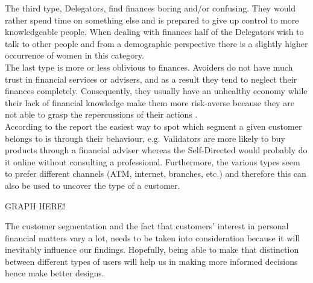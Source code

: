 The third type, Delegators, find finances boring and/or confusing. They would rather spend time on something else and is prepared to give up control to more knowledgeable people. When dealing with finances half of the Delegators wish to talk to other people and from a demographic perspective there is a slightly higher occurrence of women in this category.\\
The last type is more or less oblivious to finances. Avoiders do not have much trust in financial services or advisers, and as a result they tend to neglect their finances completely. Consequently, they usually have an unhealthy economy while their lack of financial knowledge make them more risk-averse because they are not able to grasp the repercussions of their actions \cite[p.~10-11]{ensor2006segmenting}.\\
According to the report the easiest way to spot which segment a given customer belongs to is through their behaviour, e.g. Validators are more likely to buy products through a financial adviser whereas the Self-Directed would probably do it online without consulting a professional. Furthermore, the various types seem to prefer different channels (ATM, internet, branches, etc.) and therefore this can also be used to uncover the type of a customer.

GRAPH HERE!

The customer segmentation and the fact that customers’ interest in personal financial matters vary a lot, needs to be taken into consideration because it will inevitably influence our findings. Hopefully, being able to make that distinction between different types of users will help us in making more informed decisions hence make better designs.
